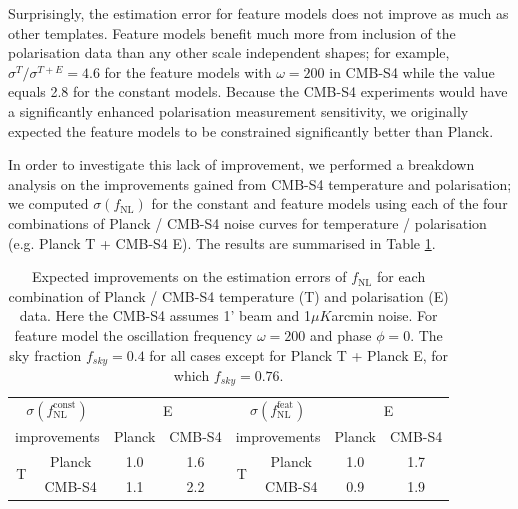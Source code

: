 Surprisingly, the estimation error for feature models does not improve as much as other templates. Feature models benefit much more from inclusion of the polarisation data than any other scale independent shapes; for example, $\sigma^{T}/\sigma^{T+E} = 4.6$ for the feature models with $\omega=200$ in CMB-S4 while the value equals 2.8 for the constant models. Because the CMB-S4 experiments would have a significantly enhanced polarisation measurement sensitivity, we originally expected the feature models to be constrained significantly better than Planck.

In order to investigate this lack of improvement, we performed a breakdown analysis on the improvements gained from CMB-S4 temperature and polarisation; we computed $\sigma(f_\text{NL})$ for the constant and feature models using each of the four combinations of Planck / CMB-S4 noise curves for temperature / polarisation (e.g. Planck T + CMB-S4 E). The results are summarised in Table \ref{forecast mixed}.

\begin{table}[ht]
	\caption{Expected improvements on the estimation errors of $f_\text{NL}$ for each combination of Planck / CMB-S4 temperature (T) and polarisation (E) data. Here the CMB-S4 assumes 1' beam and 1$\mu K$arcmin noise. For feature model the oscillation frequency $\omega=200$ and phase $\phi=0$. The sky fraction $f_{sky}=0.4$ for all cases except for Planck T + Planck E, for which $f_{sky}=0.76$.}
	\centering
	\label{forecast mixed}
	\renewcommand{\arraystretch}{1.5}
	\begin{tabular}{c c c c c c c c}
		\toprule
		\multicolumn{2}{c}{$\sigma(f_\text{NL}^\text{const})$}  &  \multicolumn{2}{c}{E}  & \multicolumn{2}{c}{$\sigma(f_\text{NL}^\text{feat})$}  &  \multicolumn{2}{c}{E}  \\
		\cmidrule(lr){3-4} \cmidrule(lr){7-8} 
		\multicolumn{2}{c}{improvements}  & Planck & CMB-S4 & \multicolumn{2}{c}{improvements}  & Planck & CMB-S4 \\
		\cmidrule(lr){1-4} \cmidrule(lr){5-8}
		\multirow{2}{*}{T} & Planck & 1.0 & 1.6 & \multirow{2}{*}{T} & Planck & 1.0 & 1.7 \\
		& CMB-S4 & 1.1 & 2.2 & & CMB-S4 & 0.9 & 1.9 \\
		\bottomrule
	\end{tabular}
\end{table}


